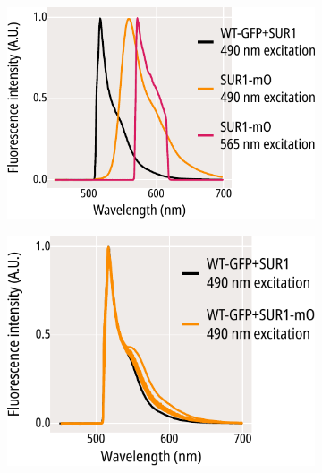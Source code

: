 \begin{figure}[hbtp]
	\centering
	\begin{subfigure}[t]{0.3\textwidth}
		\caption{}\label{ch6fig:gfp_mo_spectra_1}
		\centering
		\includegraphics[width=\textwidth]{gfp_mo_spectra_1.pdf}
	\end{subfigure}
	\hfill
	\begin{subfigure}[t]{0.3\textwidth}
		\caption{}\label{ch6fig:wt_gfp_mo_spectra_1}
		\centering
		\includegraphics[width=\textwidth]{wt_gfp_mo_spectra_1.pdf}
	\end{subfigure}
	\hfill
	\begin{subfigure}[t]{0.3\textwidth}
		\caption{}\label{ch6fig:w311_gfp_mo_spectra_1}
		\centering

\end{subfigure}
\end{figure}

